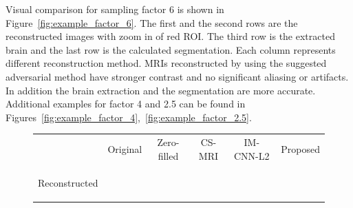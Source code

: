 \documentclass[review]{elsarticle}
\begin{document}
Visual comparison for sampling factor 6 is shown in Figure~\ref{fig:example_factor_6}. The first and the second rows are the reconstructed images with zoom in of red ROI. The third row is the extracted brain and the last row is the calculated segmentation. Each column represents different reconstruction method. MRIs reconstructed by using the suggested adversarial method have stronger contrast and no significant aliasing or artifacts. In addition the brain extraction and the segmentation are more accurate. Additional examples for factor 4 and 2.5 can be found in Figures~\ref{fig:example_factor_4},~\ref{fig:example_factor_2.5}.

\begin{figure}[H]
	\begin{raggedleft}
		\hspace*{-2cm} \begin{tabular}{cccccc}
			& \multicolumn{1}{c}{\footnotesize Original} & {\footnotesize Zero-filled} & {\footnotesize CS-MRI} & {\footnotesize IM-CNN-L2} & {\footnotesize Proposed}\tabularnewline
			\multirow{1}{0.05cm}[1.8cm]{\begin{turn}{90} {\footnotesize Reconstructed} \end{turn}} &
			

\end{tabular}
\end{raggedleft}
\end{figure}
\end{document}
